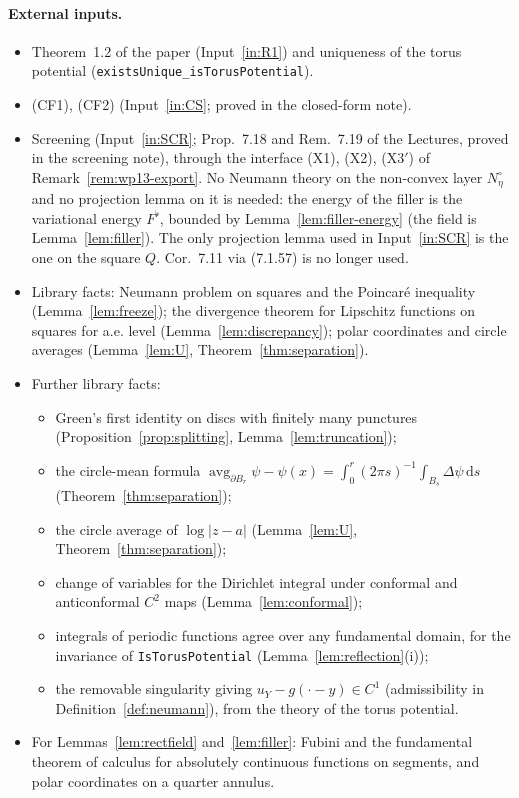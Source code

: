 \documentclass[11pt]{article}
\theoremstyle{definition}
\theoremstyle{remark}
\newcommand{\dd}{\,\mathrm d}
\newcommand{\lean}[1]{\texttt{#1}}
\begin{document}
\paragraph{External inputs.}
\begin{itemize}[leftmargin=*]
\item Theorem~1.2 of the paper (Input~\ref{in:R1}) and uniqueness of the torus potential (\lean{existsUnique\_isTorusPotential}).
\item (CF1), (CF2) (Input~\ref{in:CS}; proved in the closed-form note).
\item Screening (Input~\ref{in:SCR}; Prop.~7.18 and Rem.~7.19 of the Lectures, proved in the screening note), through the interface
  (X1), (X2), (X3$'$) of Remark~\ref{rem:wp13-export}. No Neumann theory on the non-convex layer $N_\eta^\circ$
  and no projection lemma on it is needed: the energy of the filler is the variational energy $F^\flat$,
  bounded by Lemma~\ref{lem:filler-energy} (the field is Lemma~\ref{lem:filler}). The only projection lemma
  used in Input~\ref{in:SCR} is the one on the square $Q$. Cor.~7.11 via (7.1.57) is no longer used.
\item Library facts: Neumann problem on squares and the Poincaré inequality
  (Lemma~\ref{lem:freeze}); the divergence theorem for Lipschitz functions on squares for a.e.
  level (Lemma~\ref{lem:discrepancy}); polar coordinates and circle averages
  (Lemma~\ref{lem:U}, Theorem~\ref{thm:separation}).
\item Further library facts:
  \begin{itemize}[leftmargin=*]
  \item Green's first identity on discs with finitely many punctures
    (Proposition~\ref{prop:splitting}, Lemma~\ref{lem:truncation});
  \item the circle-mean formula
    $\operatorname{avg}_{\partial B_r}\psi-\psi(x)=\int_0^r(2\pi s)^{-1}\int_{B_s}\Delta\psi\dd s$
    (Theorem~\ref{thm:separation});
  \item the circle average of $\log|z-a|$ (Lemma~\ref{lem:U}, Theorem~\ref{thm:separation});
  \item change of variables for the Dirichlet integral under conformal and anticonformal $C^2$
    maps (Lemma~\ref{lem:conformal});
  \item integrals of periodic functions agree over any fundamental domain, for the invariance of
    \texttt{IsTorusPotential} (Lemma~\ref{lem:reflection}(i));
  \item the removable singularity giving $u_Y-g(\cdot-y)\in C^1$ (admissibility in
    Definition~\ref{def:neumann}), from the theory of the torus potential.
  \end{itemize}
\item For Lemmas~\ref{lem:rectfield} and~\ref{lem:filler}: Fubini and the fundamental theorem of calculus for absolutely
  continuous functions on segments, and polar coordinates on a quarter annulus.
\end{itemize}
\end{document}
